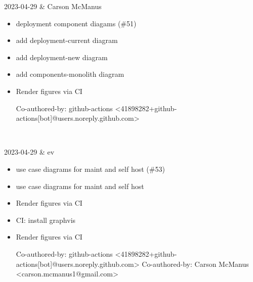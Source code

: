 2023-04-29 & Carson McManus
\begin{itemize}[topsep=0pt,itemsep=0pt,parsep=0pt,partopsep=0pt,leftmargin=12pt]
\item deployment component diagams (\#51)

\item add deployment-current diagram

\item add deployment-new diagram

\item add components-monolith diagram

\item Render figures via CI



Co-authored-by: github-actions <41898282+github-actions[bot]@users.noreply.github.com>
\end{itemize}
\\ \hline

2023-04-29 & ev
\begin{itemize}[topsep=0pt,itemsep=0pt,parsep=0pt,partopsep=0pt,leftmargin=12pt]
\item use case diagrams for maint and self host (\#53)

\item use case diagrams for maint and self host

\item Render figures via CI

\item CI: install graphvis

\item Render figures via CI



Co-authored-by: github-actions <41898282+github-actions[bot]@users.noreply.github.com>
Co-authored-by: Carson McManus <carson.mcmanus1@gmail.com>
\end{itemize}
\\ \hline

